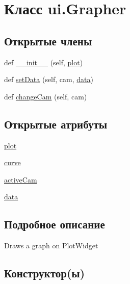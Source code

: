 \hypertarget{classui_1_1_grapher}{}\section{Класс ui.\+Grapher}
\label{classui_1_1_grapher}
\subsection*{Открытые члены}
\begin{DoxyCompactItemize}
\item 
def \hyperlink{classui_1_1_grapher_adc14400ac80cf0e0ed6c03ef6672dd0d}{\+\_\+\+\_\+init\+\_\+\+\_\+} (self, \hyperlink{classui_1_1_grapher_a7baf77d6615f5ae10d6beba8185e2e7e}{plot})
\item 
def \hyperlink{classui_1_1_grapher_a84bfc263d057da0961099866932fa80f}{set\+Data} (self, cam, \hyperlink{classui_1_1_grapher_a17abaedfc40072844120f9d23f39be35}{data})
\item 
def \hyperlink{classui_1_1_grapher_ab3993d59f2ea6e3af6009c3e0c2d8c4a}{change\+Cam} (self, cam)
\end{DoxyCompactItemize}
\subsection*{Открытые атрибуты}
\begin{DoxyCompactItemize}
\item 
\hyperlink{classui_1_1_grapher_a7baf77d6615f5ae10d6beba8185e2e7e}{plot}
\item 
\hyperlink{classui_1_1_grapher_a475445c115a0ac2912a1cf0353821198}{curve}
\item 
\hyperlink{classui_1_1_grapher_af236b91aa7aba6c79319ba3fd496267f}{active\+Cam}
\item 
\hyperlink{classui_1_1_grapher_a17abaedfc40072844120f9d23f39be35}{data}
\end{DoxyCompactItemize}


\subsection{Подробное описание}
\begin{DoxyVerb}Draws a graph on PlotWidget\end{DoxyVerb}
 

\subsection{Конструктор(ы)}
\mbox{\label{classui_1_1_grapher_adc14400ac80cf0e0ed6c03ef6672dd0d}} 
